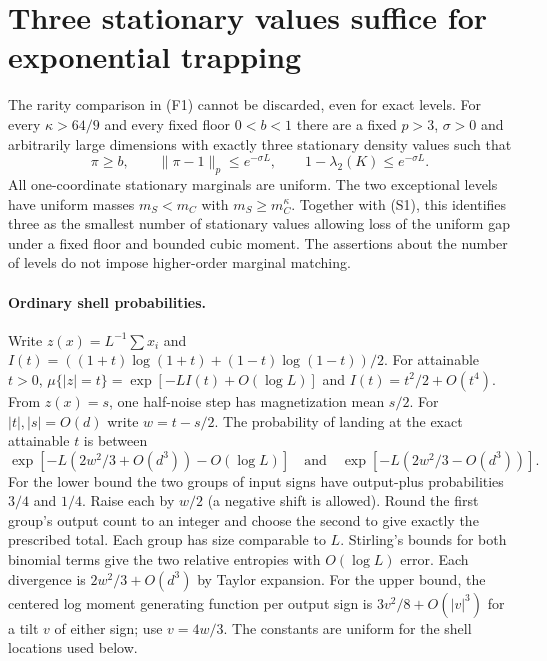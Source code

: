 \section{Three stationary values suffice for exponential trapping}
\label{sec:three-values}
The rarity comparison in (F1) cannot be discarded, even for exact
levels. For every $\kappa>64/9$ and every fixed floor $0<b<1$ there
are a fixed $p>3$, $\sigma>0$ and arbitrarily large dimensions with
exactly three stationary density values such that
\[
 \pi\ge b,\qquad \|\pi-1\|_p\le e^{-\sigma L},\qquad
 1-\lambda_2(K)\le e^{-\sigma L}.
 \tag{T1}
\]
All one-coordinate stationary marginals are uniform. The two exceptional
levels have uniform masses $m_S<m_C$ with $m_S\ge m_C^\kappa$.
Together with (S1), this identifies three as the smallest number of
stationary values allowing loss of the uniform gap under a fixed floor
and bounded cubic moment. The assertions about the number of levels
do not impose higher-order marginal matching.

\paragraph{Ordinary shell probabilities.}
Write $z(x)=L^{-1}\sum x_i$ and $I(t)=((1+t)\log(1+t)
+(1-t)\log(1-t))/2$. For attainable $t>0$,
$\mu\{|z|=t\}=\exp[-LI(t)+O(\log L)]$ and $I(t)=t^2/2+O(t^4)$.
From $z(x)=s$, one half-noise step has magnetization mean $s/2$.
For $|t|,|s|=O(d)$ write $w=t-s/2$. The probability of landing at
the exact attainable $t$ is between
\[
 \exp[-L(2w^2/3+O(d^3))-O(\log L)]
 \quad\text{and}\quad
 \exp[-L(2w^2/3-O(d^3))].
 \tag{T2}
\]
For the lower bound the two groups of input signs have output-plus
probabilities $3/4$ and $1/4$. Raise each by $w/2$ (a negative shift
is allowed). Round the first group's output count to an integer and
choose the second to give exactly the prescribed total. Each group
has size comparable to $L$. Stirling's bounds for both binomial terms
give the two relative entropies with $O(\log L)$ error. Each divergence
is $2w^2/3+O(d^3)$ by Taylor expansion. For the upper bound, the
centered log moment generating function per output sign is
$3v^2/8+O(|v|^3)$ for a tilt $v$ of either sign; use $v=4w/3$.
The constants are uniform for the shell locations used below.

